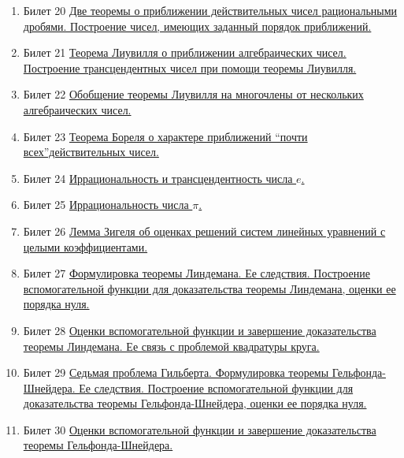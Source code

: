 \documentclass[a4paper,12pt]{article}
\begin{document}
\begin{enumerate}
\item{Билет 20}
\hyperlink{bil20}{Две теоремы о приближении действительных чисел рациональными дробями. Построение чисел, имеющих заданный порядок приближений.}

\item{Билет 21}
\hyperlink{bil21}{Теорема Лиувилля о приближении алгебраических чисел. Построение трансцендентных чисел при помощи теоремы Лиувилля.}


\item{Билет 22}
\hyperlink{bil22}{Обобщение теоремы Лиувилля на многочлены от нескольких алгебраических чисел.}


\item{Билет 23}
\hyperlink{bil23}{Теорема Бореля о характере приближений \textquotedblleft  почти всех\textquotedblright  действительных чисел.}

\item{Билет 24}
\hyperlink{bil24}{Иррациональность и трансцендентность числа $e$.}


\item{Билет 25}
\hyperlink{bil25}{Иррациональность числа $\pi$.}

\item{Билет 26}
\hyperlink{bil26}{Лемма Зигеля об оценках решений систем линейных уравнений с целыми коэффициентами.}

\item{Билет 27}
\hyperlink{bil27}{Формулировка теоремы Линдемана. Ее следствия. Построение вспомогательной функции для доказательства теоремы Линдемана, оценки ее порядка нуля.}

\item{Билет 28}
\hyperlink{bil28}{Оценки вспомогательной функции и завершение доказательства теоремы Линдемана. Ее связь с проблемой квадратуры круга.}

\item{Билет 29}
\hyperlink{bil29}{Седьмая проблема Гильберта. Формулировка теоремы Гельфонда-Шнейдера. Ее следствия. Построение вспомогательной функции для доказательства теоремы Гельфонда-Шнейдера, оценки ее порядка нуля.}

\item{Билет 30}
\hyperlink{bil30}{Оценки вспомогательной функции и завершение доказательства теоремы Гельфонда-Шнейдера.}


\end{enumerate}



\large
\end{document}
